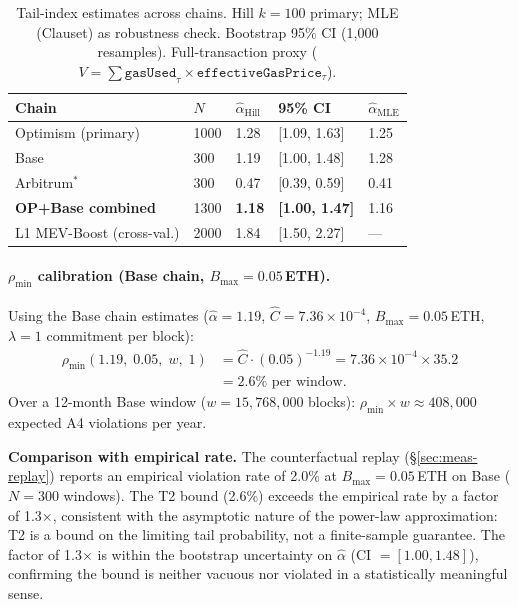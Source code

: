 \begin{table}[h]
\centering
\small
\caption{Tail-index estimates across chains. Hill $k=100$ primary;
  MLE (Clauset) as robustness check. Bootstrap 95\% CI (1,000 resamples).
  Full-transaction proxy ($V = \sum \texttt{gasUsed}_\tau \times
  \texttt{effectiveGasPrice}_\tau$).}
\label{tab:alpha-estimates}
\begin{tabular}{@{}lllll@{}}
\toprule
Chain & $N$ & $\hat{\alpha}_{\text{Hill}}$ & 95\% CI & $\hat{\alpha}_{\text{MLE}}$ \\
\midrule
Optimism (primary)  & 1000 & 1.28 & [1.09, 1.63] & 1.25 \\
Base                &  300 & 1.19 & [1.00, 1.48] & 1.28 \\
Arbitrum$^*$        &  300 & 0.47 & [0.39, 0.59] & 0.41 \\
\midrule
\textbf{OP+Base combined} & 1300 & \textbf{1.18} & \textbf{[1.00, 1.47]} & 1.16 \\
\midrule
L1 MEV-Boost (cross-val.) & 2000 & 1.84 & [1.50, 2.27] & --- \\
\bottomrule
\end{tabular}
\end{table}

\paragraph{$\rho_{\min}$ calibration (Base chain, $B_{\max} = 0.05$\,ETH).}
Using the Base chain estimates ($\hat{\alpha} = 1.19$, $\hat{C} = 7.36 \times
10^{-4}$, $B_{\max} = 0.05$\,ETH, $\lambda = 1$ commitment per block):
\begin{align*}
  \rho_{\min}(1.19,\; 0.05,\; w,\; 1)
  &= \hat{C} \cdot (0.05)^{-1.19}
   = 7.36 \!\times\! 10^{-4} \times 35.2 \\
  &= \mathbf{2.6\%} \text{ per window.}
\end{align*}
Over a 12-month Base window ($w = 15{,}768{,}000$ blocks):
$\rho_{\min} \times w \approx 408{,}000$ expected A4 violations per year.

\noindent\textbf{Comparison with empirical rate.}
The counterfactual replay (\S\ref{sec:meas-replay}) reports an empirical
violation rate of 2.0\% at $B_{\max} = 0.05$\,ETH on Base ($N=300$ windows).
The T2 bound (2.6\%) exceeds the empirical rate by a factor of 1.3$\times$,
consistent with the asymptotic nature of the power-law approximation: T2
is a bound on the limiting tail probability, not a finite-sample guarantee.
The factor of 1.3$\times$ is within the bootstrap uncertainty on $\hat{\alpha}$
(CI $= [1.00, 1.48]$), confirming the bound is neither vacuous nor violated in
a statistically meaningful sense.


